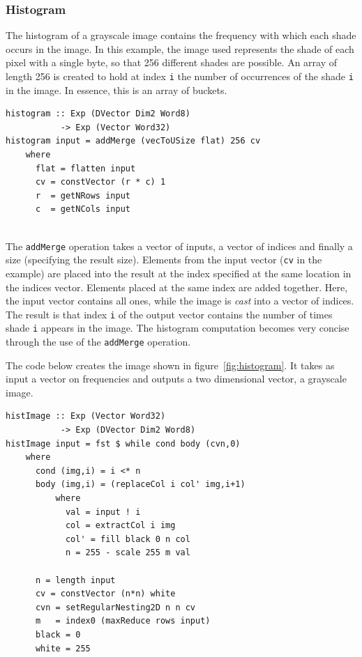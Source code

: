\subsubsection{Histogram}
\FloatBarrier

The histogram of a grayscale image contains the frequency with 
which each shade occurs in the image. In this example, the image used represents 
the shade of each pixel with a single byte, so that
256 different shades are possible. An array of length 256 is created to hold at index 
{\tt i} the number of occurrences of the shade {\tt i} in the image. In essence, this 
is an array of buckets. 

\begin{verbatim}
histogram :: Exp (DVector Dim2 Word8)  
           -> Exp (Vector Word32)
histogram input = addMerge (vecToUSize flat) 256 cv
    where
      flat = flatten input
      cv = constVector (r * c) 1 
      r  = getNRows input 
      c  = getNCols input
      
\end{verbatim}

The {\tt addMerge} operation takes a vector of inputs, a vector of 
indices and finally a size (specifying the result size). Elements from the 
input vector ({\tt cv} in the example) are placed into the result
at the index specified at 
the same location in the indices vector. Elements placed at the same
index are added together. Here, the input vector contains all ones, 
while the image is {\em cast} into a vector of indices.
The result 
is that index {\tt i} of the output vector contains the number of times
shade {\tt i} appears in the image.
The histogram
computation becomes very concise through the use of the {\tt addMerge} operation.

The code below creates the image shown in figure~\ref{fig:histogram}. It 
takes as input a vector on frequencies and outputs a two dimensional vector, 
a grayscale image. 

\begin{verbatim}
histImage :: Exp (Vector Word32) 
           -> Exp (DVector Dim2 Word8) 
histImage input = fst $ while cond body (cvn,0)    
    where 
      cond (img,i) = i <* n 
      body (img,i) = (replaceCol i col' img,i+1) 
          where 
            val = input ! i 
            col = extractCol i img
            col' = fill black 0 n col
            n = 255 - scale 255 m val  
                    
      n = length input 
      cv = constVector (n*n) white  
      cvn = setRegularNesting2D n n cv
      m   = index0 (maxReduce rows input)
      black = 0 
      white = 255
\end{verbatim}


